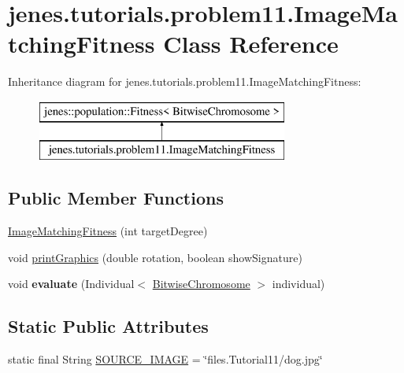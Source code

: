 \hypertarget{classjenes_1_1tutorials_1_1problem11_1_1_image_matching_fitness}{\section{jenes.\-tutorials.\-problem11.\-Image\-Matching\-Fitness Class Reference}
\label{classjenes_1_1tutorials_1_1problem11_1_1_image_matching_fitness}
}
Inheritance diagram for jenes.\-tutorials.\-problem11.\-Image\-Matching\-Fitness\-:\begin{figure}[H]
\begin{center}
\leavevmode
\includegraphics[height=2.000000cm]{classjenes_1_1tutorials_1_1problem11_1_1_image_matching_fitness}
\end{center}
\end{figure}
\subsection*{Public Member Functions}
\begin{DoxyCompactItemize}
\item 
\hyperlink{classjenes_1_1tutorials_1_1problem11_1_1_image_matching_fitness_ab2d23d7e2f9d4cbb57d5818dbcf91e05}{Image\-Matching\-Fitness} (int target\-Degree)
\item 
void \hyperlink{classjenes_1_1tutorials_1_1problem11_1_1_image_matching_fitness_a57d1723f3fea82e96455935aefb360b9}{print\-Graphics} (double rotation, boolean show\-Signature)
\item 
\hypertarget{classjenes_1_1tutorials_1_1problem11_1_1_image_matching_fitness_ad1678b0716a862654451a29b12964ec1}{void {\bfseries evaluate} (Individual$<$ \hyperlink{classjenes_1_1chromosome_1_1_bitwise_chromosome}{Bitwise\-Chromosome} $>$ individual)}\label{classjenes_1_1tutorials_1_1problem11_1_1_image_matching_fitness_ad1678b0716a862654451a29b12964ec1}

\end{DoxyCompactItemize}
\subsection*{Static Public Attributes}
\begin{DoxyCompactItemize}
\item 
static final String \hyperlink{classjenes_1_1tutorials_1_1problem11_1_1_image_matching_fitness_abcca6e100ede27ef9a90ddbc35497efd}{S\-O\-U\-R\-C\-E\-\_\-\-I\-M\-A\-G\-E} = \char`\"{}files.\-Tutorial11/dog.\-jpg\char`\"{}
\end{DoxyCompactItemize}
